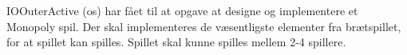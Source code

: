 IOOuterActive (os) har fået til at opgave at designe og implementere et Monopoly  spil. Der skal implementeres de væsentligste elementer fra brætspillet, for at spillet kan spilles. Spillet skal kunne spilles mellem 2-4 spillere.
